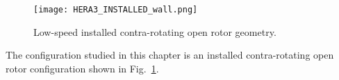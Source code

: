 
\begin{figure}[htp]
  \centering
  \texttt{[image: HERA3\_INSTALLED\_wall.png]}
  \caption{Low-speed installed contra-rotating open rotor geometry.}
  \label{fig:HERA3_INSTALLED_wall}
\end{figure}

The configuration studied in this chapter is an 
installed contra-rotating open rotor configuration shown
in Fig.~\ref{fig:HERA3_INSTALLED_wall}.